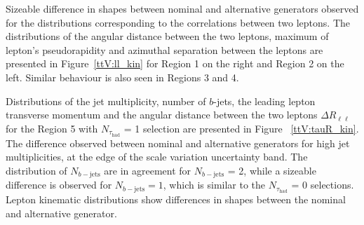 Sizeable difference in shapes between nominal and alternative generators observed for the distributions corresponding to the correlations between two leptons.
The distributions of the angular distance between the two leptons, maximum of lepton's pseudorapidity and azimuthal separation between the leptons are presented in Figure~\ref{ttV:ll_kin} for Region 1 on the right and Region 2 on the left. 
Similar behaviour is also seen in Regions 3 and 4.

Distributions of the jet multiplicity, number of $b$-jets, the leading lepton transverse momentum and the angular distance between the two leptons  $\Delta R _{\ell \ell }$ for the Region 5 with $N_{\tau_\mathrm{had}}$ = 1 selection are presented in Figure ~\ref{ttV:tauR_kin}.
The difference observed between nominal and alternative generators for high jet multiplicities, at the edge of the scale variation uncertainty band. 
The distribution of $N_{b-\mathrm{jets}}$ are in agreement for $N_{b-\mathrm{jets}}$ = 2, while a sizeable difference is observed for $N_{b-\mathrm{jets}} = 1$, which is similar to the $N_{\tau_\mathrm{had}}$ = 0 selections. 
Lepton kinematic distributions show differences in shapes between the nominal and alternative generator.

